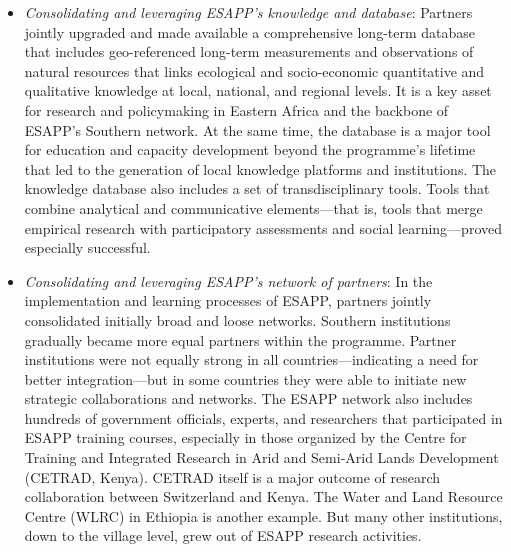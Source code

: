 \documentclass[10pt,a4paper]{article}
\begin{document}
\begin{multicols}{2}
\begin{itemize}
\item \textit{Consolidating and leveraging ESAPP's knowledge and database}: Partners jointly upgraded and made available a comprehensive long-term database that includes geo-referenced long-term measurements and observations of natural resources that  links ecological and socio-economic quantitative and qualitative knowledge at local, national, and regional levels. It is a key asset for research and policymaking in Eastern Africa and the backbone of ESAPP's Southern network. At the same time, the database is a major tool for education and capacity development beyond the programme's lifetime that led to the generation of local knowledge platforms and institutions. The knowledge database also includes a set of transdisciplinary tools. Tools that combine analytical and communicative elements---that is, tools that merge empirical research with participatory assessments and social learning---proved especially successful.
\item \textit{Consolidating and leveraging ESAPP's network of partners}: In the implementation and learning processes of ESAPP, partners jointly consolidated initially broad and loose networks. Southern institutions gradually became more equal partners within the programme. Partner institutions were not equally strong in all countries---indicating a need for better integration---but in some countries they were able to initiate new strategic collaborations and networks. The ESAPP network also includes hundreds of government officials, experts, and researchers that participated in ESAPP training courses, especially in those organized by the Centre for Training and Integrated Research in Arid and Semi-Arid Lands Development (CETRAD, Kenya). CETRAD itself is a major outcome of research collaboration between Switzerland and Kenya. The Water and Land Resource Centre (WLRC) in Ethiopia is another example. But many other institutions, down to the village level, grew out of ESAPP research activities. 
\end{itemize}


\end{multicols}
\end{document}
